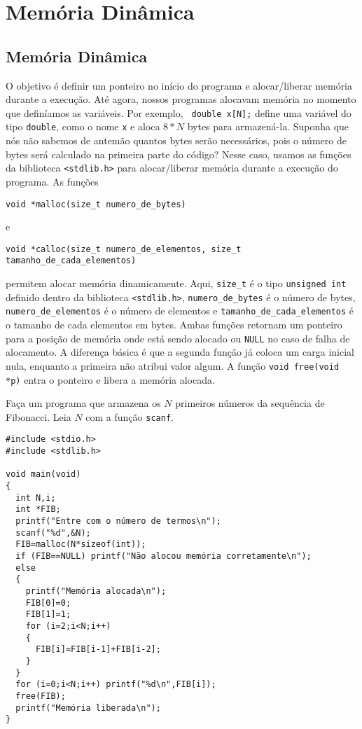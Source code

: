

\chapter{Memória Dinâmica}
\section{Memória Dinâmica}
O objetivo é definir um ponteiro no início do programa e alocar/liberar memória durante a execução. Até agora, nossos programas alocavam memória no momento que definíamos as variáveis. Por exemplo, \verb| double x[N];| define uma variável do tipo \verb|double|, como o nome \verb|x| e aloca $8*N$ bytes para armazená-la. Suponha que nós não sabemos de antemão quantos bytes serão necessários, pois o número de bytes será calculado na primeira parte do código? Nesse caso, usamos as funções da biblioteca \verb|<stdlib.h>| para alocar/liberar memória durante a execução do programa. As funções
\begin{verbatim}
void *malloc(size_t numero_de_bytes)
\end{verbatim}
e
\begin{verbatim}
void *calloc(size_t numero_de_elementos, size_t tamanho_de_cada_elementos)
\end{verbatim}
permitem alocar memória dinamicamente. Aqui, \verb|size_t| é o tipo \verb|unsigned int| definido dentro da biblioteca \verb|<stdlib.h>|, \verb|numero_de_bytes| é o número de bytes, \verb|numero_de_elementos| é o número de elementos e \verb|tamanho_de_cada_elementos| é o tamanho de cada elementos em bytes. Ambas funções retornam um ponteiro para a posição de memória onde está sendo alocado ou \verb|NULL| no caso de falha de alocamento. A diferença básica é que a segunda função já coloca um carga inicial nula, enquanto a primeira não atribui valor algum. A função \verb|void free(void *p)| entra o ponteiro e libera a memória alocada.
\begin{ex}
Faça um programa que armazena os $N$ primeiros números da sequência de Fibonacci. Leia $N$ com a função \verb|scanf|.
\end{ex}
\begin{verbatim}
#include <stdio.h>
#include <stdlib.h>

void main(void)
{
  int N,i;
  int *FIB;
  printf("Entre com o número de termos\n");
  scanf("%d",&N);
  FIB=malloc(N*sizeof(int));
  if (FIB==NULL) printf("Não alocou memória corretamente\n");
  else
  {
    printf("Memória alocada\n");
    FIB[0]=0;
    FIB[1]=1;
    for (i=2;i<N;i++)
    {
      FIB[i]=FIB[i-1]+FIB[i-2];
    }
  }
  for (i=0;i<N;i++) printf("%d\n",FIB[i]);
  free(FIB);
  printf("Memória liberada\n");
}
\end{verbatim}


